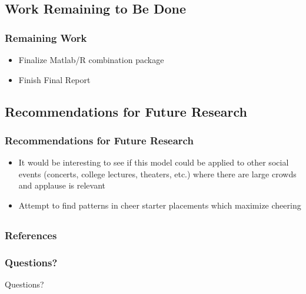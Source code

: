 \documentclass[compress,handout,10pt]{beamer}
\let\olditem\item
\renewcommand{\item}{\setlength{\itemsep}{0.5\baselineskip}\olditem}
\begin{document}
\subsection{Work Remaining to Be Done}

\begin{frame}
	\frametitle{Remaining Work}
	\begin {itemize}
		\item Finalize Matlab/R combination package
		\item Finish Final Report 
		\end {itemize}
\end{frame}

\subsection{Recommendations for Future Research}

\begin{frame}
	\frametitle {Recommendations for Future Research}
	\begin {itemize}
		\item It would be interesting to see if this model could be applied to other social events (concerts, college lectures, theaters, etc.) where there are large crowds and applause is relevant
		\item Attempt to find patterns in cheer starter placements which maximize cheering
	\end {itemize}
\end{frame}

\subsection{}

\begin {frame} [allowframebreaks]
	\frametitle{References}
	
	
\end {frame}

\begin{frame}
	\frametitle {Questions?}
	\begin{center}
		Questions?
	\end{center}
\end{frame}
\end{document}
